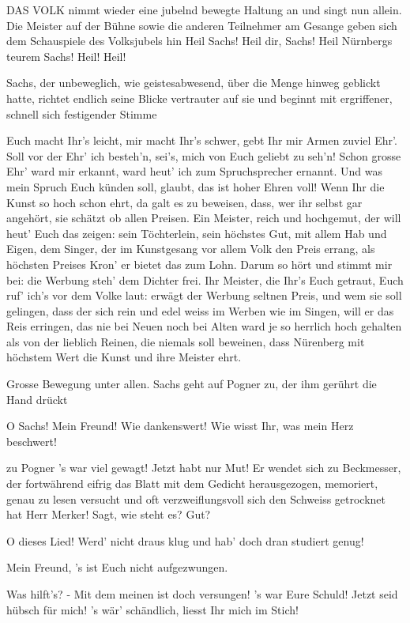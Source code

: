 \begin{drama}
DAS VOLK
nimmt wieder eine jubelnd bewegte Haltung an und singt nun allein. Die Meister auf der Bühne sowie die anderen Teilnehmer am Gesange geben sich dem Schauspiele des Volksjubels hin
Heil Sachs! Heil dir, Sachs!
Heil Nürnbergs teurem Sachs! Heil! Heil!

Sachs, der unbeweglich, wie geistesabwesend, über die Menge hinweg geblickt hatte, richtet endlich seine Blicke vertrauter auf sie und beginnt mit ergriffener, schnell sich festigender Stimme

\Sachsspeaks
Euch macht Ihr's leicht, mir macht Ihr's schwer,
gebt Ihr mir Armen zuviel Ehr'.
Soll vor der Ehr' ich besteh'n,
sei's, mich von Euch geliebt zu seh'n!
Schon grosse Ehr' ward mir erkannt,
ward heut' ich zum Spruchsprecher ernannt.
Und was mein Spruch Euch künden soll,
glaubt, das ist hoher Ehren voll!
Wenn Ihr die Kunst so hoch schon ehrt,
da galt es zu beweisen,
dass, wer ihr selbst gar angehört,
sie schätzt ob allen Preisen.
Ein Meister, reich und hochgemut,
der will heut' Euch das zeigen:
sein Töchterlein, sein höchstes Gut,
mit allem Hab und Eigen,
dem Singer, der im Kunstgesang
vor allem Volk den Preis errang,
als höchsten Preises Kron'
er bietet das zum Lohn.
Darum so hört und stimmt mir bei:
die Werbung steh' dem Dichter frei.
Ihr Meister, die Ihr's Euch getraut,
Euch ruf' ich's vor dem Volke laut:
erwägt der Werbung seltnen Preis,
und wem sie soll gelingen,
dass der sich rein und edel weiss
im Werben wie im Singen,
will er das Reis erringen,
das nie bei Neuen noch bei Alten
ward je so herrlich hoch gehalten
als von der lieblich Reinen,
die niemals soll beweinen,
dass Nürenberg mit höchstem Wert
die Kunst und ihre Meister ehrt.

Grosse Bewegung unter allen. Sachs geht auf Pogner zu, der ihm gerührt die Hand drückt

\Pognerspeaks
O Sachs! Mein Freund! Wie dankenswert!
Wie wisst Ihr, was mein Herz beschwert!

\Sachsspeaks
zu Pogner
's war viel gewagt! Jetzt habt nur Mut!
Er wendet sich zu Beckmesser, der fortwährend eifrig das Blatt mit dem Gedicht herausgezogen, memoriert, genau zu lesen versucht und oft verzweiflungsvoll sich den Schweiss getrocknet hat
Herr Merker! Sagt, wie steht es? Gut?

\Beckmesserspeaks
O dieses Lied! Werd' nicht draus klug
und hab' doch dran studiert genug!

\Sachsspeaks
Mein Freund, 's ist Euch nicht aufgezwungen.

\Beckmesserspeaks
Was hilft's? - Mit dem meinen ist doch versungen!
's war Eure Schuld! Jetzt seid hübsch für mich!
's wär' schändlich, liesst Ihr mich im Stich!


\end{drama}
